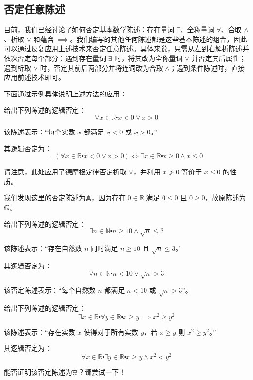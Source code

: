 \subsection{否定任意陈述}

目前，我们已经讨论了如何否定基本数学陈述：存在量词 $\exists$、全称量词 $\forall$、合取 $\land$、析取 $\lor$ 和蕴含 $\implies$。我们编写的其他任何陈述都是这些基本陈述的组合，因此可以通过反复应用上述技术来否定任意陈述。具体来说，只需从左到右解析陈述并依次否定每个部分：遇到存在量词 $\exists$ 时，将其改为全称量词 $\forall$ 并否定其后属性；遇到析取 $\lor$ 时，否定其前后两部分并将连词改为合取 $\land$；遇到条件陈述时，直接应用前述技术即可。

下面通过示例具体说明上述方法的应用：

\begin{example}
    给出下列陈述的逻辑否定：
    \[\forall x \in \mathbb{R} \centerdot x < 0 \lor x > 0\]

    该陈述表示：``每个实数 $x$ 都满足 $x < 0$ 或 $x > 0$。''

    其逻辑否定为：
    \[\neg (\forall x \in \mathbb{R} \centerdot x < 0 \lor x > 0) \iff \exists x \in \mathbb{R} \centerdot x \ge 0 \land x \le 0\]

    请注意，此处应用了德摩根定律否定析取 $\lor$，并利用 $x \ngtr 0$ 等价于 $x \le 0$ 的性质。

    我们发现这里的否定陈述为\verb|真|，因为存在 $0 \in \mathbb{R}$ 满足 $0 \le 0$ 且 $0 \ge 0$，故原陈述为\verb|假|。
\end{example}

\begin{example}
    给出下列陈述的逻辑否定：
    \[\exists n \in \mathbb{N} \centerdot n \ge 10 \land \sqrt{n} \le 3\]

    该陈述表示：``存在自然数 $n$ 同时满足 $n \ge 10$ 且 $\sqrt{n} \le 3$。''

    其逻辑否定为：
    \[\forall n \in \mathbb{N} \centerdot n < 10 \lor \sqrt{n} > 3\]

    该否定陈述表示：``每个自然数 $n$ 都满足 $n < 10$ 或 $\sqrt{n} > 3$''。
\end{example}

\begin{example}
    给出下列陈述的逻辑否定：
    \[\exists x \in \mathbb{R} \centerdot \forall y \in \mathbb{R} \centerdot x \ge y \implies x^2 \ge y^2\]
    
    该陈述表示：``存在实数 $x$ 使得对于所有实数 $y$，若 $x \ge y$ 则 $x^2 \ge y^2$。''

    其逻辑否定为：
    \[\forall x \in \mathbb{R} \centerdot \exists y \in \mathbb{R} \centerdot x \ge y \land x^2 < y^2\]
    
    能否证明该否定陈述为\verb|真|？请尝试一下！
\end{example}

